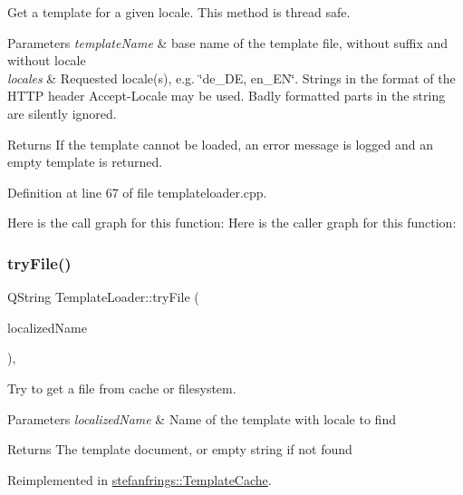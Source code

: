 Get a template for a given locale. This method is thread safe. 
\begin{DoxyParams}{Parameters}
{\em template\+Name} & base name of the template file, without suffix and without locale \\
\hline
{\em locales} & Requested locale(s), e.\+g. \char`\"{}de\+\_\+\+D\+E, en\+\_\+\+E\+N\char`\"{}. Strings in the format of the H\+T\+TP header Accept-\/\+Locale may be used. Badly formatted parts in the string are silently ignored. \\
\hline
\end{DoxyParams}
\begin{DoxyReturn}{Returns}
If the template cannot be loaded, an error message is logged and an empty template is returned. 
\end{DoxyReturn}


Definition at line 67 of file templateloader.\+cpp.

Here is the call graph for this function\+:
Here is the caller graph for this function\+:
\mbox{\label{classstefanfrings_1_1_template_loader_a006cbda0c014ad08199563ea56fc05a3}} 
\subsubsection{\texorpdfstring{try\+File()}{tryFile()}}
{\footnotesize\ttfamily Q\+String Template\+Loader\+::try\+File (\begin{DoxyParamCaption}\item[{Q\+String}]{localized\+Name }\end{DoxyParamCaption})\hspace{0.3cm}{\ttfamily [protected]}, {\ttfamily [virtual]}}

Try to get a file from cache or filesystem. 
\begin{DoxyParams}{Parameters}
{\em localized\+Name} & Name of the template with locale to find \\
\hline
\end{DoxyParams}
\begin{DoxyReturn}{Returns}
The template document, or empty string if not found 
\end{DoxyReturn}


Reimplemented in \mbox{\hyperlink{classstefanfrings_1_1_template_cache_a65584abe7d62c93659c741f41bdeeada}{stefanfrings\+::\+Template\+Cache}}.



